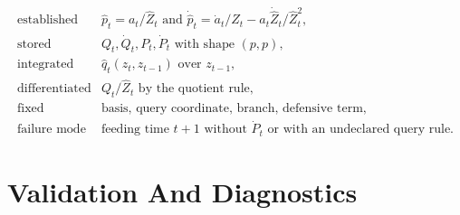 \documentclass[11pt]{article}
\numberwithin{equation}{section}
\begin{document}
\begin{equation}
\begin{array}{ll}
\text{established} &
    \widehat p_t=a_t/\widehat Z_t
    \text{ and }
    \dot{\widehat p}_t=\dot a_t/\widehat Z_t
    -a_t\dot{\widehat Z}_t/\widehat Z_t^2,\\[1mm]
\text{stored} &
    Q_t,\dot Q_t,P_t,\dot P_t
    \text{ with shape }(p,p),\\[1mm]
\text{integrated} &
    \widehat q_t(z_t,z_{t-1}) \text{ over } z_{t-1},\\[1mm]
\text{differentiated} &
    Q_t/\widehat Z_t \text{ by the quotient rule},\\[1mm]
\text{fixed} &
    \text{basis, query coordinate, branch, defensive term},\\[1mm]
\text{failure mode} &
    \text{feeding time }t+1\text{ without }\dot P_t
    \text{ or with an undeclared query rule.}
\end{array}
\label{eq:p24-p22-r4}
\end{equation}

\appendix
\section{Validation And Diagnostics}
\end{document}
